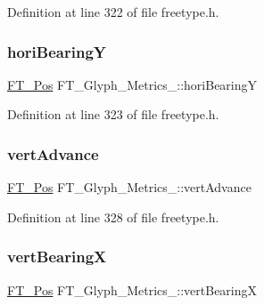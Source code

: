 Definition at line 322 of file freetype.\+h.

\mbox{\label{struct_f_t___glyph___metrics___afd97c10d43ed1f66598a18884468b536}} 
\subsubsection{\texorpdfstring{horiBearingY}{horiBearingY}}
{\footnotesize\ttfamily \mbox{\hyperlink{ftimage_8h_af5f230f4b253d4c7715fd2e595614c90}{F\+T\+\_\+\+Pos}} F\+T\+\_\+\+Glyph\+\_\+\+Metrics\+\_\+\+::hori\+BearingY}



Definition at line 323 of file freetype.\+h.

\mbox{\label{struct_f_t___glyph___metrics___a594f43c64fe5c12a399a0f0a47c04990}} 
\subsubsection{\texorpdfstring{vertAdvance}{vertAdvance}}
{\footnotesize\ttfamily \mbox{\hyperlink{ftimage_8h_af5f230f4b253d4c7715fd2e595614c90}{F\+T\+\_\+\+Pos}} F\+T\+\_\+\+Glyph\+\_\+\+Metrics\+\_\+\+::vert\+Advance}



Definition at line 328 of file freetype.\+h.

\mbox{\label{struct_f_t___glyph___metrics___aead5c5637b983b811738bff3bcea8cea}} 
\subsubsection{\texorpdfstring{vertBearingX}{vertBearingX}}
{\footnotesize\ttfamily \mbox{\hyperlink{ftimage_8h_af5f230f4b253d4c7715fd2e595614c90}{F\+T\+\_\+\+Pos}} F\+T\+\_\+\+Glyph\+\_\+\+Metrics\+\_\+\+::vert\+BearingX}



